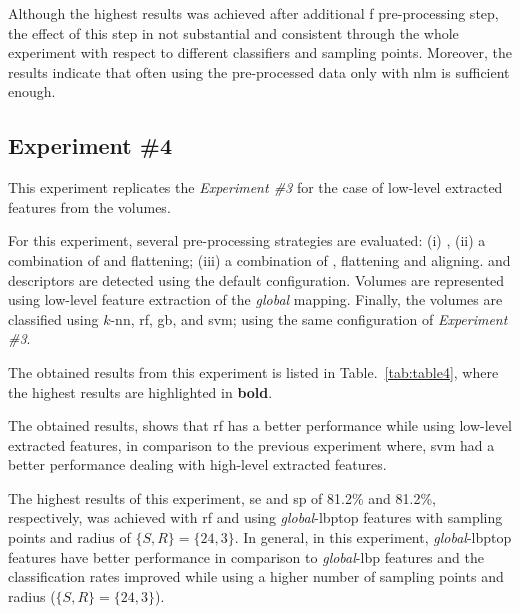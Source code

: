 Although the highest results was achieved after additional \ac{f} pre-processing step, the effect of this step in not substantial and consistent through the whole experiment with respect to different classifiers and sampling points.
Moreover, the results indicate that often using the pre-processed data only with \ac{nlm} is sufficient enough.




\subsection{Experiment \#4}\label{subsec:exp4}
%
%
%
%

This experiment replicates the \emph{Experiment \#3} for the case of low-level extracted features from the volumes.

For this experiment, several pre-processing strategies are evaluated: (i) \nlm, (ii) a combination of \nlm and flattening; (iii) a combination of \nlm, flattening and aligning.
\lbp and \lbptop descriptors are detected using the default configuration.
Volumes are represented using low-level feature extraction of the \emph{global} mapping.
Finally, the volumes are classified using $k$-\ac{nn}, \ac{rf}, \ac{gb}, and \ac{svm}; using the same configuration of \emph{Experiment \#3}.

The obtained results from this experiment is listed in Table.~\ref{tab:table4}, where the highest results are highlighted in \textbf{bold}.


The obtained results, shows that \ac{rf} has a better performance while using low-level extracted features, in comparison to the previous experiment where, \ac{svm} had a better performance dealing with high-level extracted features.

The highest results of this experiment, \ac{se} and \ac{sp} of 81.2\% and 81.2\%, respectively, was achieved with \ac{rf} and using \emph{global}-\ac{lbptop} features with sampling points and radius of $\{S,R\}=\{24,3\}$.
In general, in this experiment, \emph{global}-\ac{lbptop} features have better performance in comparison to \emph{global}-\ac{lbp} features and the  classification rates improved while using a higher number of sampling points and radius ($\{S,R\}=\{24,3\}$).

